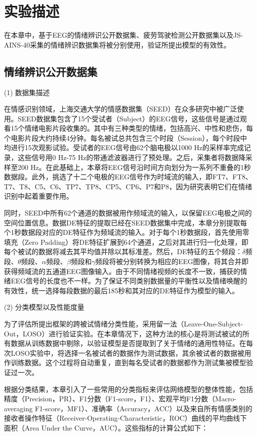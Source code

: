 \section{实验描述}
在本章中，基于EEG的情绪辨识公开数据集、疲劳驾驶检测公开数据集以及JS-AINS-40采集的情绪辨识数据集将被分别使用，验证所提出模型的有效性。
\subsection{情绪辨识公开数据集}
(1) 数据集描述

在情感识别领域，上海交通大学的情感数据集（SEED）在众多研究中被广泛使用\cite{3-2}。SEED数据集包含了15个受试者（Subject）的EEG信号，这些信号是通过观看15个情绪电影片段收集的。其中有三种类型的情绪，包括高兴、中性和悲伤，每个电影片段大约持续4分钟。每名被试总共包含三个时段（Session），每个时段中均进行15次观影试验。受试者的EEG信号由62个脑电极以1000 Hz的采样率完成记录，这些信号用0 Hz-75 Hz的带通滤波器进行了预处理。之后，采集者将数据降采样至200 Hz。在此基础上，本章将EEG信号沿时间方向划分为一系列不重叠的1秒数据段。此外，挑选了十二个电极的EEG信号作为时域流的输入，即FT7、FT8、T7、T8、C5、C6、TP7、TP8、CP5、CP6、P7和P8，因为研究表明它们在情绪识别中起着重要作用\cite{3-11}。

同时，SEED中所有62个通道的数据被用作频域流的输入，以保留EEG电极之间的空间位置信息。数据DE特征的提取已经在SEED数据集中完成，本章分别提取每个1秒数据段对应的DE特征作为频域流的输入。对于每个1秒数据段，首先使用零填充（Zero Padding）将DE特征扩展到64个通道，之后对其进行归一化处理，即每个被试的数据将减去其平均值并除以其标准差。然后，DE特征的五个频段：$\delta$频段、$\theta$频段、$\alpha$频段、$\beta$频段和$\gamma$频段将被分别转换为相应的EEG图像，将其合并即获得频域流的五通道EEG图像输入。由于不同情绪视频的长度不一致，捕获的情绪EEG信号的长度也不一样。为了保证不同类别数据量的平衡性以及情绪唤醒的有效性，统一选择每段数据的最后185秒和其对应的DE特征作为模型的输入。

(2) 分类模型以及性能度量

为了评估所提出框架的跨被试情绪分类性能，采用留一法（Leave-One-Subject-Out，LOSO）进行验证实验。在本章情况下，这种方法的核心是将测试被试的所有数据从训练数据中剔除，以验证模型是否提取到了关于情绪的通用性特征\cite{3-13}。在每次LOSO实验中，将选择一名被试者的数据作为测试数据，其余被试者的数据被用作训练数据。这个过程将自动重复，直到每名受试者的数据都作为测试集被模型验证过一次。

根据分类结果，本章引入了一些常用的分类指标来评估网络模型的整体性能，包括精度（Precision，PR）、F1分数（F1-score，F1）\cite{3-14}、宏观平均F1分数（Macro-averaging F1-score，MF1）、准确率（Accuracy，ACC）以及来自所有情感类别的接收者操作特征（Receiver-Operating-Characteristic，ROC）曲线的平均曲线下面积（Area Under the Curve，AUC）。这些指标的计算公式如下：


